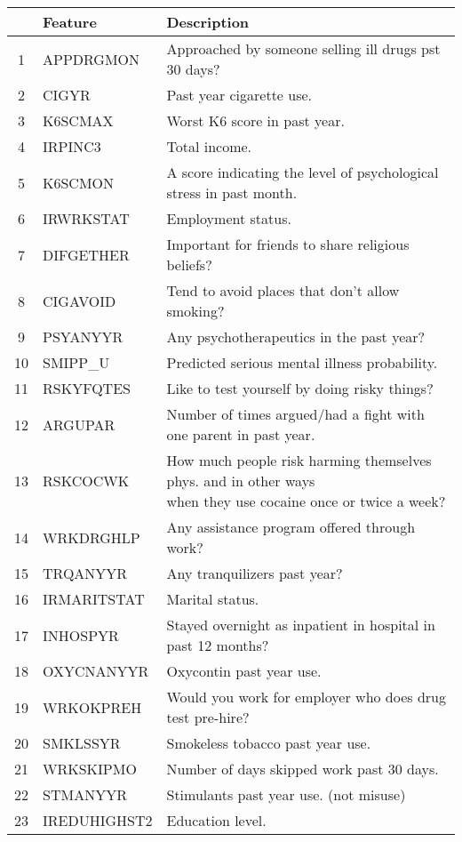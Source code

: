 \documentclass[12pt]{article}
\begin{document}
\begin{table}

	\centering
	\begin{tabular}{c|l|l}
		& Feature& Description \\ 
		\hline
		1 & APPDRGMON	& Approached by someone selling ill drugs pst 30 days?	\\
		2 & CIGYR	& Past year cigarette use.	\\
		3 & K6SCMAX	& Worst K6 score in past year.	\\
		4 & IRPINC3	& Total income.	\\
		5 & K6SCMON		& A score indicating the level of psychological stress in past month.	\\
		6 & IRWRKSTAT	& Employment status.	\\
		7 & DIFGETHER	& Important for friends to share religious beliefs?	\\
		8 & CIGAVOID	& Tend to avoid places that don’t allow smoking?	\\
		9 & PSYANYYR	& Any psychotherapeutics in the past year?	\\
		10 & SMIPP\_U	& Predicted serious mental illness probability.	\\
		11 & RSKYFQTES	& Like to test yourself by doing risky things?	\\
		12 & ARGUPAR	& Number of times argued/had a fight with one parent in past year.	\\
		13& RSKCOCWK	& \pbox{20cm}{How much people risk harming themselves phys. and in other ways\\ when they use cocaine once or twice a week?}	\\
		14 & WRKDRGHLP	& Any assistance program offered through work?	\\
		15 & TRQANYYR	& Any tranquilizers past year?	\\
		16 & IRMARITSTAT	& Marital status.	\\
		17 & INHOSPYR	& Stayed overnight as inpatient in hospital in past 12 months?	\\
		18 & OXYCNANYYR	& Oxycontin past year use.	\\
		19 & WRKOKPREH	& Would you work for employer who does drug test pre-hire?	\\
		20 & SMKLSSYR	& Smokeless tobacco past year use.	\\
		21 & WRKSKIPMO	& Number of days skipped work past 30 days.	\\
		22 & STMANYYR	& Stimulants past year use. (not misuse)	\\
		23 & IREDUHIGHST2	& Education level.	\\

\end{tabular}
\end{table}
\end{document}
